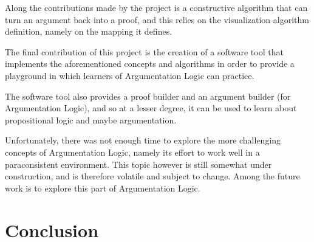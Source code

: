 \documentclass[11pt,twoside,a4paper]{report}
\begin{document}
Along the contributions made by the project is a constructive algorithm that can turn an argument back into a proof, and this relies on the visualization algorithm definition, namely on the mapping it defines.

The final contribution of this project is the creation of a software tool that implements the aforementioned concepts and algorithms in order to provide a playground in which learners of Argumentation Logic can practice. 

The software tool also provides a proof builder and an argument builder (for Argumentation Logic), and so at a lesser degree, it can be used to learn about propositional logic and maybe argumentation.

Unfortunately, there was not enough time to explore the more challenging concepts of Argumentation Logic, namely its effort to work well in a paraconsistent environment. This topic however is still somewhat under construction, and is therefore volatile and subject to change. Among the future work is to explore this part of Argumentation Logic.

\chapter{Conclusion}
\label{chap:chiliconclusion}

\listoffigures

\lstlistoflistings



\end{document}
